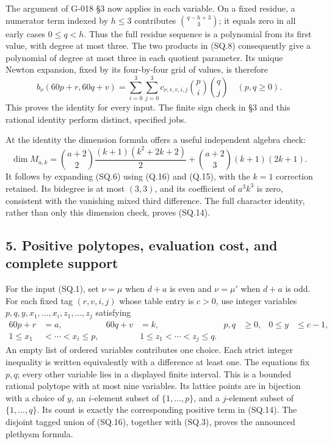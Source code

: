 \documentclass[
  10pt,
]{article}
\begin{document}
The argument of G-018 §3 now applies in each variable. On a fixed
residue, a numerator term indexed by \(h\le3\) contributes
\(\binom{q-h+3}{3}\); it equals zero in all early cases \(0\le q<h\).
Thus the full residue sequence is a polynomial from its first value,
with degree at most three. The two products in (SQ.8) consequently give
a polynomial of degree at most three in each quotient parameter. Its
unique Newton expansion, fixed by its four-by-four grid of values, is
therefore \[
\boxed{b_\nu(60p+r,60q+v)
=\sum_{i=0}^3\sum_{j=0}^3
c_{\nu,r,v,i,j}\binom pi\binom qj
\quad(p,q\ge0).}
\tag{SQ.14}
\] This proves the identity for every input. The finite sign check in §3
and this rational identity perform distinct, specified jobs.

At the identity the dimension formula offers a useful independent
algebra check: \[
\dim M_{a,k}
=\binom{a+2}{2}\frac{(k+1)(k^2+2k+2)}2
+\binom{a+2}{3}(k+1)(2k+1).
\tag{SQ.15}
\] It follows by expanding (SQ.6) using (Q.16) and (Q.15), with the
\(k=1\) correction retained. Its bidegree is at most \((3,3)\), and its
coefficient of \(a^3k^3\) is zero, consistent with the vanishing mixed
third difference. The full character identity, rather than only this
dimension check, proves (SQ.14).

\subsection{5. Positive polytopes, evaluation cost, and complete
support}\label{positive-polytopes-evaluation-cost-and-complete-support}

For the input (SQ.1), set \(\nu=\mu\) when \(d+a\) is even and
\(\nu=\mu'\) when \(d+a\) is odd. For each fixed tag \((r,v,i,j)\) whose
table entry is \(c>0\), use integer variables
\(p,q,y,x_1,\ldots,x_i,z_1,\ldots,z_j\) satisfying \[
\begin{aligned}
60p+r&=a,&60q+v&=k,&p,q&\ge0,&0\le y&\le c-1,\\
1\le x_1&<\cdots<x_i\le p,
&&1\le z_1<\cdots<z_j\le q.
\end{aligned}
\tag{SQ.16}
\] An empty list of ordered variables contributes one choice. Each
strict integer inequality is written equivalently with a difference at
least one. The equations fix \(p,q\); every other variable lies in a
displayed finite interval. This is a bounded rational polytope with at
most nine variables. Its lattice points are in bijection with a choice
of \(y\), an \(i\)-element subset of \(\{1,\ldots,p\}\), and a
\(j\)-element subset of \(\{1,\ldots,q\}\). Its count is exactly the
corresponding positive term in (SQ.14). The disjoint tagged union of
(SQ.16), together with (SQ.3), proves the announced plethysm formula.
\end{document}
